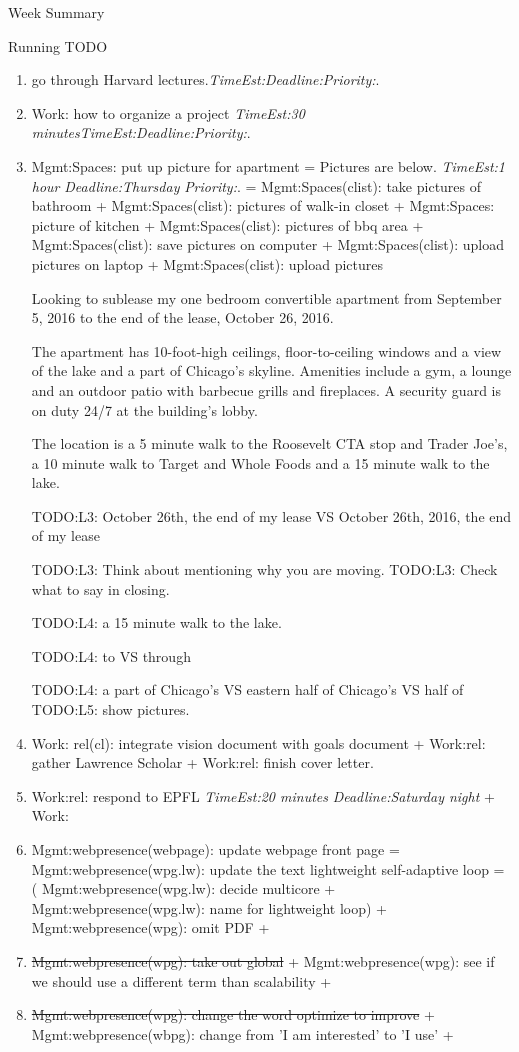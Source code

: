 \documentclass[serif, mathserif, final]{beamer}
\newcommand{\doneTask}[1]{\tiny \item \tiny \sout{#1}}
\newcommand{\te}[1]{\textit{TimeEst:}\textit{#1}}
\newcommand{\dl}[1]{\textit{Deadline:}\textit{#1}}
\newcommand{\pr}[1]{\textit{Priority:}\textit{#1}}
\begin{document}
\begin{frame}
\begin{columns}
\begin{column}{0.5\linewidth}
\begin{block}{Week Summary}
\begin{block}{Running TODO}
\begin{enumerate}
      \item \tiny go through Harvard lectures.\te{}\dl{}\pr{}. 

      \item \tiny Work: how to organize a project \te{30
        minutes}\te{}\dl{}\pr{}.

\item \tiny Mgmt:Spaces: put up picture for apartment =  
Pictures are below.  \te{1 hour} \dl{Thursday} \pr{}.  
= Mgmt:Spaces(clist): take pictures of bathroom + Mgmt:Spaces(clist):
pictures of walk-in closet + Mgmt:Spaces: picture of kitchen +
Mgmt:Spaces(clist): pictures of bbq area + Mgmt:Spaces(clist): save pictures
on computer + Mgmt:Spaces(clist): upload pictures on laptop +
Mgmt:Spaces(clist): upload pictures 

Looking to sublease my one bedroom convertible apartment from
September 5, 2016 to the end of the lease, October 26, 2016.

The apartment has 10-foot-high ceilings, floor-to-ceiling windows and
a view of the lake and a part of Chicago's skyline. Amenities include
a gym, a lounge and an outdoor patio with barbecue grills and
fireplaces. A security guard is on duty 24/7 at the building's lobby.

The location is a 5 minute walk to the Roosevelt CTA stop and Trader
Joe's, a 10 minute walk to Target and Whole Foods and a 15 minute walk
to the lake. 

TODO:L3: October 26th, the end of my lease VS October 26th,
2016, the end of my lease 

TODO:L3: Think about mentioning why you are moving. 
TODO:L3: Check what to say in closing. 

TODO:L4: a 15 minute walk to the lake. 

TODO:L4: to VS through 

TODO:L4: a part of Chicago's VS eastern half of Chicago's VS half of 
TODO:L5: show pictures.

      \item \tiny Work: rel(cl): integrate vision document with goals
        document + Work:rel: gather Lawrence Scholar +  Work:rel:
        finish cover letter. 
        
      \item \tiny Work:rel: respond to EPFL \te{20 minutes}
        \dl{Saturday night} + Work:  

    \item \tiny Mgmt:webpresence(webpage): update webpage front page =
      Mgmt:webpresence(wpg.lw): update the text lightweight self-adaptive
      loop = ( Mgmt:webpresence(wpg.lw): decide multicore +
      Mgmt:webpresence(wpg.lw): name for lightweight loop) +
      Mgmt:webpresence(wpg): omit PDF  + \doneTask{Mgmt:webpresence(wpg): take
      out global} +  Mgmt:webpresence(wpg): see if we should use a different term
      than scalability  + \doneTask{Mgmt:webpresence(wpg): change the word
      optimize to improve}  + Mgmt:webpresence(wbpg): change from 'I am
      interested' to 'I use' + 


\end{enumerate}
\end{block}
\end{block}
\end{column}
\end{columns}
\end{frame}
\end{document}
